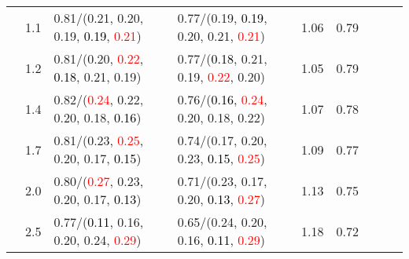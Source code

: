 \documentclass[10pt,a4paper]{report}
\begin{document}
\begin{table}[!htbp]
\begin{center}
{\begin{tabular}{ccllccccc}
				  & 1.1                               & 0.81/(0.21, 0.20, 0.19, \textcolor{black}{0.19}, \textcolor{red}{0.21})                                                                                                                       & 0.77/(0.19, \textcolor{black}{0.19}, 0.20, 0.21, \textcolor{red}{0.21})                                                                                                                       & 1.06             & 0.79                     \\
				  & 1.2                               & 0.81/(0.20, \textcolor{red}{0.22}, \textcolor{black}{0.18}, 0.21, 0.19)                                                                                                                       & 0.77/(\textcolor{black}{0.18}, 0.21, 0.19, \textcolor{red}{0.22}, 0.20)                                                                                                                       & 1.05             & 0.79                     \\
				  & 1.4                               & 0.82/(\textcolor{red}{0.24}, 0.22, 0.20, 0.18, \textcolor{black}{0.16})                                                                                                                       & 0.76/(\textcolor{black}{0.16}, \textcolor{red}{0.24}, 0.20, 0.18, 0.22)                                                                                                                       & 1.07             & 0.78                     \\
				  & 1.7                               & 0.81/(0.23, \textcolor{red}{0.25}, 0.20, 0.17, \textcolor{black}{0.15})                                                                                                                       & 0.74/(0.17, 0.20, 0.23, \textcolor{black}{0.15}, \textcolor{red}{0.25})                                                                                                                       & 1.09             & 0.77                     \\
				  & 2.0                               & 0.80/(\textcolor{red}{0.27}, 0.23, 0.20, 0.17, \textcolor{black}{0.13})                                                                                                                       & 0.71/(0.23, 0.17, 0.20, \textcolor{black}{0.13}, \textcolor{red}{0.27})                                                                                                                       & 1.13             & 0.75                     \\
				  & 2.5                               & 0.77/(\textcolor{black}{0.11}, 0.16, 0.20, 0.24, \textcolor{red}{0.29})                                                                                                                       & 0.65/(0.24, 0.20, 0.16, \textcolor{black}{0.11}, \textcolor{red}{0.29})                                                                                                                       & 1.18             & 0.72                     \\

\end{tabular}}
\end{center}
\end{table}
\end{document}
